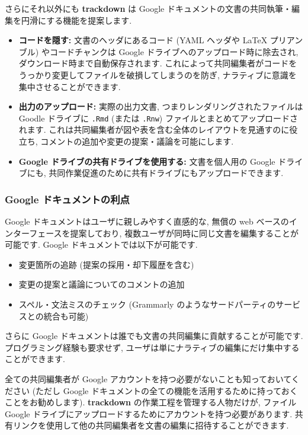 \documentclass[
  11pt,
  lualatex,ja=standard,jafont=noto]{bxjsreport}
\providecommand{\tightlist}{%
  \setlength{\itemsep}{0pt}\setlength{\parskip}{0pt}}
\begin{document}
さらにそれ以外にも \textbf{trackdown} は Google ドキュメントの文書の共同執筆・編集を円滑にする機能を提案します.

\begin{itemize}
\item
  \textbf{コードを隠す:} 文書のヘッダにあるコード (YAML ヘッダや LaTeX プリアンブル) やコードチャンクは Google ドライブへのアップロード時に除去され, ダウンロード時まで自動保存されます. これによって共同編集者がコードをうっかり変更してファイルを破損してしまうのを防ぎ, ナラティブに意識を集中させることができます.
\item
  \textbf{出力のアップロード:} 実際の出力文書, つまりレンダリングされたファイルは Goodle ドライブに \texttt{.Rmd} (または \texttt{.Rnw}) ファイルとまとめてアップロードされます. これは共同編集者が図や表を含む全体のレイアウトを見通すのに役立ち, コメントの追加や変更の提案・議論を可能にします.
\item
  \textbf{Google ドライブの共有ドライブを使用する:} 文書を個人用の Google ドライブにも, 共同作業促進のために共有ドライブにもアップロードできます.
\end{itemize}

\hypertarget{google-ux30c9ux30adux30e5ux30e1ux30f3ux30c8ux306eux5229ux70b9}{%
\subsubsection*{Google ドキュメントの利点}\label{google-ux30c9ux30adux30e5ux30e1ux30f3ux30c8ux306eux5229ux70b9}}

Google ドキュメントはユーザに親しみやすく直感的な, 無償の web ベースのインターフェースを提案しており, 複数ユーザが同時に同じ文書を編集することが可能です. Google ドキュメントでは以下が可能です.

\begin{itemize}
\tightlist
\item
  変更箇所の追跡 (提案の採用・却下履歴を含む)
\item
  変更の提案と議論についてのコメントの追加
\item
  スペル・文法ミスのチェック (Grammarly のようなサードパーティのサービスとの統合も可能)
\end{itemize}

さらに Google ドキュメントは誰でも文書の共同編集に貢献することが可能です. プログラミング経験も要求せず, ユーザは単にナラティブの編集にだけ集中することができます.

全ての共同編集者が Google アカウントを持つ必要がないことも知っておいてください (ただし Google ドキュメントの全ての機能を活用するために持っておくことをお勧めします). \textbf{trackdown} の作業工程を管理する人物だけが, ファイル Google ドライブにアップロードするためにアカウントを持つ必要があります. 共有リンクを使用して他の共同編集者を文書の編集に招待することができます.
\end{document}

